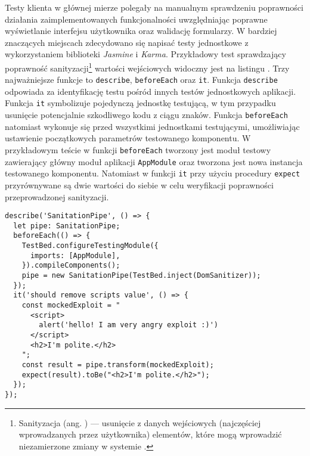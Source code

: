 

Testy klienta w głównej mierze polegały na manualnym sprawdzeniu poprawności działania zaimplementowanych
funkcjonalności uwzględniając poprawne wyświetlanie interfejsu użytkownika oraz walidację formularzy. W bardziej
znaczących miejscach zdecydowano się napisać testy jednostkowe z wykorzystaniem biblioteki \textit{Jasmine} i
\textit{Karma}. Przykładowy test sprawdzający poprawność sanityzacji\footnote{Sanityzacja (ang. )
  — usunięcie z danych wejściowych (najczęściej wprowadzanych przez użytkownika) elementów, które mogą wprowadzić
  niezamierzone zmiany w systemie \cite{bib:validation-and-sanitation}.} wartości wejściowych widoczny jest na listingu
. Trzy najważniejsze funkcje to \verb|describe|, \verb|beforeEach| oraz \verb|it|. Funkcja
\verb|describe| odpowiada za identyfikację testu pośród innych testów jednostkowych aplikacji. Funkcja \verb|it|
symbolizuje pojedynczą jednostkę testującą, w tym przypadku usunięcie potencjalnie szkodliwego kodu z ciągu znaków.
Funkcja \verb|beforeEach| natomiast wykonuje się przed wszystkimi jednostkami testującymi, umożliwiając ustawienie
początkowych parametrów testowanego komponentu. W przykładowym teście w funkcji \verb|beforeEach| tworzony jest moduł
testowy zawierający główny moduł aplikacji \verb|AppModule| oraz tworzona jest nowa instancja testowanego komponentu.
Natomiast w funkcji \verb|it| przy użyciu procedury \verb|expect| przyrównywane są dwie wartości do siebie w celu
weryfikacji poprawności przeprowadzonej sanityzacji.
%
\begin{lstlisting}[style=JSES6Base,label={lis:client-test},caption={Przykładowy test jednostkowy w aplikacji klienta}]
describe('SanitationPipe', () => {
  let pipe: SanitationPipe;
  beforeEach(() => {
    TestBed.configureTestingModule({
      imports: [AppModule],
    }).compileComponents();
    pipe = new SanitationPipe(TestBed.inject(DomSanitizer));
  });
  it('should remove scripts value', () => {
    const mockedExploit = "
      <script>
        alert('hello! I am very angry exploit :)')
      </script>
      <h2>I'm polite.</h2>
    ";
    const result = pipe.transform(mockedExploit);
    expect(result).toBe("<h2>I'm polite.</h2>");
  });
});
\end{lstlisting}

